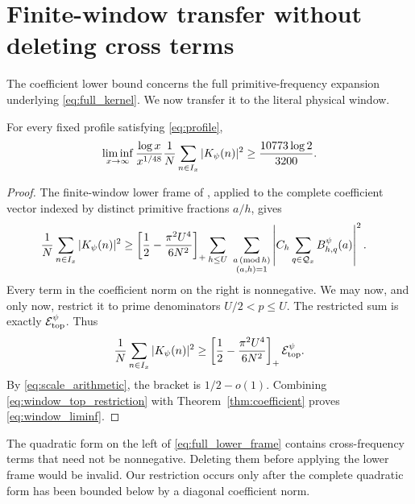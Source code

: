\section{Finite-window transfer without deleting cross terms}\label{sec:window}

The coefficient lower bound concerns the full primitive-frequency expansion
underlying \eqref{eq:full_kernel}.  We now transfer it to the literal physical
window.

\begin{theorem}\label{thm:window}
For every fixed profile satisfying \eqref{eq:profile},
\begin{equation}\label{eq:window_liminf}
 \liminf_{x\to\infty}\frac{\log x}{x^{1/48}}
 \frac{1}{N}\sum_{n\in I_x} |K_\psi(n)|^2
 \geq \frac{10773\log 2}{3200}.
\end{equation}
\end{theorem}

\begin{proof}
The finite-window lower frame of \cite{WangTPC238}, applied to the complete
coefficient vector indexed by distinct primitive fractions $a/h$, gives
\begin{align}
 \frac{1}{N}\sum_{n\in I_x} |K_\psi(n)|^2
 &\geq
 \left[\frac12-\frac{\pi^2U^4}{6N^2}\right]_+
 \sum_{h\leq U}\ \sum_{\substack{a\, (\mathrm{mod}\,h)\\(a,h)=1}}
 \left|C_h\sum_{q\in\mathcal{Q}_x}B_{h,q}^\psi(a)\right|^2.
 \label{eq:full_lower_frame}
\end{align}
Every term in the coefficient norm on the right is nonnegative.  We may now,
and only now, restrict it to prime denominators $U/2<p\leq U$.  The restricted
sum is exactly $\mathcal{E}_{\mathrm{top}}^{\psi}$.  Thus
\begin{equation}\label{eq:window_top_restriction}
 \frac{1}{N}\sum_{n\in I_x} |K_\psi(n)|^2
 \geq
 \left[\frac12-\frac{\pi^2U^4}{6N^2}\right]_+\mathcal{E}_{\mathrm{top}}^{\psi}.
\end{equation}
By \eqref{eq:scale_arithmetic}, the bracket is $1/2-o(1)$.  Combining
\eqref{eq:window_top_restriction} with Theorem~\ref{thm:coefficient} proves
\eqref{eq:window_liminf}.
\end{proof}

\begin{remark}
The quadratic form on the left of \eqref{eq:full_lower_frame} contains
cross-frequency terms that need not be nonnegative.  Deleting them before
applying the lower frame would be invalid.  Our restriction occurs only after
the complete quadratic form has been bounded below by a diagonal coefficient
norm.
\end{remark}

